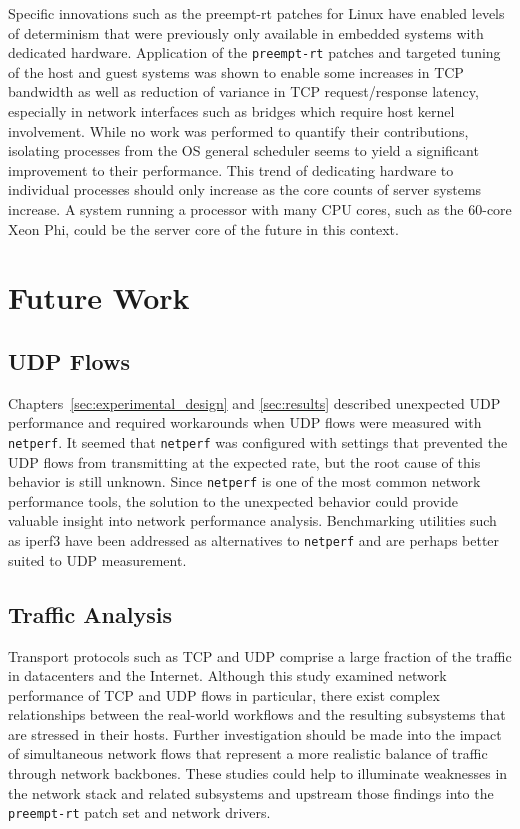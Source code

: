 Specific innovations such as the preempt-rt patches for Linux have enabled levels of determinism that were previously only available in embedded systems with dedicated hardware.  
Application of the \texttt{preempt-rt} patches and targeted tuning of the host and guest systems was shown to enable some increases in TCP bandwidth as well as reduction of variance in TCP request/response latency, especially in network interfaces such as bridges which require host kernel involvement.   
While no work was performed to quantify their contributions, isolating processes from the OS general scheduler seems to yield a significant improvement to their performance.
This trend of dedicating hardware to individual processes should only increase as the core counts of server systems increase.
A system running a processor with many CPU cores, such as the 60-core Xeon Phi, could be the server core of the future in this context.

\section{Future Work}
\label{sec:futurework}

\subsection{UDP Flows} %
\label{sec:futureudpflows}
Chapters~\ref{sec:experimental_design} and \ref{sec:results} described unexpected UDP performance and required workarounds when UDP flows were measured with \texttt{netperf}. 
It seemed that \texttt{netperf} was configured with settings that prevented the UDP flows from transmitting at the expected rate, but the root cause of this behavior is still unknown.  
Since \texttt{netperf} is one of the most common network performance tools, the solution to the unexpected behavior could provide valuable insight into network performance analysis.
Benchmarking utilities such as iperf3 \autocite{iperf3} have been addressed as alternatives to \texttt{netperf} and are perhaps better suited to UDP measurement.

\subsection{Traffic Analysis} %
\label{sub:futuretrafficanalysis}
Transport protocols such as TCP and UDP comprise a large fraction of the traffic in datacenters and the Internet.
Although this study examined network performance of TCP and UDP flows in particular, there exist complex relationships between the real-world workflows and the resulting subsystems that are stressed in their hosts.
Further investigation should be made into the impact of simultaneous network flows that represent a more realistic balance of traffic through network backbones.
These studies could help to illuminate weaknesses in the network stack and related subsystems and upstream those findings into the \texttt{preempt-rt} patch set and network drivers.

